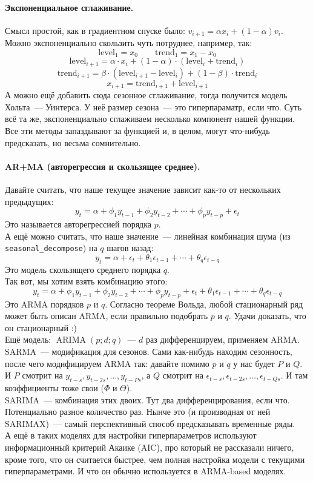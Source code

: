 \documentclass{article}
\begin{document}
    \paragraph{Экспоненциальное сглаживание.}
    Смысл простой, как в градиентном спуске было: $v_{i+1}=\alpha x_i+(1-\alpha)v_i$. Можно экспоненциально скользить чуть потруднее, например, так:
    \[
    \mathrm{level}_1=x_0\qquad\mathrm{trend}_1=x_1-x_0
    \]
    \[
    \mathrm{level}_{i+1}=\alpha\cdot x_i+(1-\alpha)\cdot(\mathrm{level}_i+\mathrm{trend}_i)\]
    \[
    \mathrm{trend}_{i+1}=\beta\cdot(\mathrm{level}_{i+1}-\mathrm{level}_i)+(1-\beta)\cdot\mathrm{trend}_i
    \]
    \[
    x_{i+1}=\mathrm{trend}_{i+1}+\mathrm{level}_{i+1}
    \]
    А можно ещё добавить сюда сезонное сглаживание, тогда получится модель Хольта~--- Уинтерса. У неё размер сезона~--- это гиперпараматр, если что. Суть всё та же, экспоненциально сглаживаем несколько компонент нашей функции.\\
    Все эти методы запаздывают за функцией и, в целом, могут что-нибудь предсказать, но весьма сомнительно.
    \paragraph{AR+MA (авторегрессия и скользящее среднее).}
    Давайте считать, что наше текущее значение зависит как-то от нескольких предыдущих:
    \[
    y_t=\alpha+\phi_1y_{t-1}+\phi_2y_{t-2}+\cdots+\phi_py_{t-p}+\epsilon_t
    \]
    Это называется авторегрессией порядка $p$.\\
    А ещё можно считать, что наше значение~--- линейная комбинация шума (из \Verb|seasonal_decompose|) на $q$ шагов назад:
    \[
    y_t=\alpha+\epsilon_t+\theta_1\epsilon_{t-1}+\cdots+\theta_q\epsilon_{t-q}
    \]
    Это модель скользящего среднего порядка $q$.\\
    Так вот, мы хотим взять комбинацию этого:
    \[
    y_t=\alpha+\phi_1y_{t-1}+\phi_2y_{t-2}+\cdots+\phi_py_{t-p}+\epsilon_t+\theta_1\epsilon_{t-1}+\cdots+\theta_q\epsilon_{t-q}
    \]
    Это ARMA порядков $p$ и $q$. Согласно теореме Вольда, любой стационарный ряд может быть описан ARMA, если правильно подобрать $p$ и $q$. Удачи доказать, что он стационарный :)\\
    Ещё модель: $\operatorname{ARIMA}(p;d;q)$~--- $d$ раз дифференцируем, применяем ARMA.\\
    SARMA~--- модификация для сезонов. Сами как-нибудь находим сезонность, после чего модифицируем ARMA так: давайте помимо $p$ и $q$ у нас будет $P$ и $Q$. И $P$ смотрит на $y_{t-s},y_{t-2s},\ldots,y_{t-Ps}$, а $Q$ смотрит на $\epsilon_{t-s},\epsilon_{t-2s},\ldots,\epsilon_{t-Qs}$. И там коэффициенты тоже свои ($\Phi$ и $\Theta$).\\
    SARIMA~--- комбинация этих двоих. Тут два дифференцирования, если что. Потенциально разное количество раз. Нынче это (и производная от ней SARIMAX)~--- самый перспективный способ предсказывать временные ряды.\\
    А ещё в таких моделях для настройки гиперпараметров используют информационный критерий Акаике (AIC), про который не рассказали ничего, кроме того, что он считается быстрее, чем полная настройка модели с текущими гиперпараметрами. И что он обычно используется в ARMA-based моделях.
\end{document}
